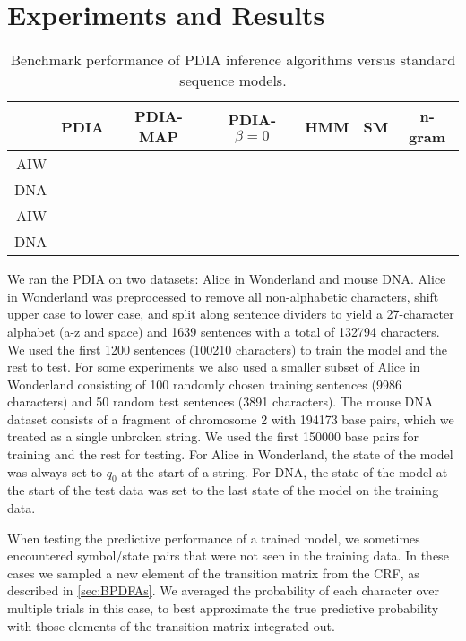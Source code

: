 \section{Experiments and Results}


\begin{table}[t]
    \begin{center}
    \setlength{\tabcolsep}{1.3mm}
\begin{tabular}{r|cccccc}
\hline
& {\bf PDIA } & PDIA-MAP & PDIA-$\beta=0$ & HMM & SM & n-gram \\
\hline
AIW & &&&&&\\
DNA & &&&&& \\
\hline
\hline
AIW & &&&&&\\
DNA & &&&&& \\
\hline
\end{tabular}
\end{center}
\caption[Short]{Benchmark performance of PDIA inference algorithms versus standard sequence models.}
\label{table:results}
\end{table}

We ran the PDIA on two datasets: Alice in Wonderland and mouse DNA.  Alice in Wonderland was preprocessed to remove all non-alphabetic characters, shift upper case to lower case, and split along sentence dividers to yield a 27-character alphabet (a-z and space) and 1639 sentences with a total of 132794 characters.  We used the first 1200 sentences (100210 characters) to train the model and the rest to test.  For some experiments we also used a smaller subset of Alice in Wonderland consisting of 100 randomly chosen training sentences (9986 characters) and 50 random test sentences (3891 characters).  The mouse DNA dataset consists of a fragment of chromosome 2 with 194173 base pairs, which we treated as a single unbroken string.  We used the first 150000 base pairs for training and the rest for testing.  For Alice in Wonderland, the state of the model was always set to $q_0$ at the start of a string.  For DNA, the state of the model at the start of the test data was set to the last state of the model on the training data.

When testing the predictive performance of a trained model, we sometimes encountered symbol/state pairs that were not seen in the training data.  In these cases we sampled a new element of the transition matrix from the CRF, as described in \ref{sec:BPDFAs}.  We averaged the probability of each character over multiple trials in this case, to best approximate the true predictive probability with those elements of the transition matrix integrated out.